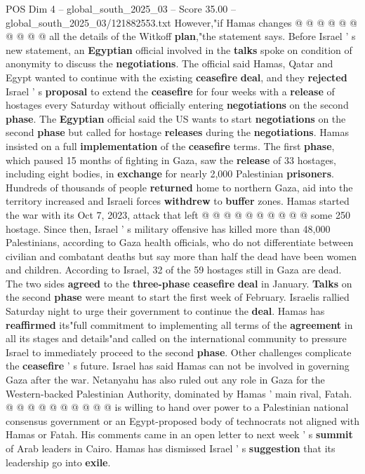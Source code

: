 \begin{textsample}{POS Dim 4 – global\_south\_2025\_03 – Score 35.00 – global\_south\_2025\_03/121882553.txt}
However,"if Hamas changes @ @ @ @ @ @ @ @ @ @ all the details of the Witkoff \textbf{plan},"the statement says.
Before Israel ' s new statement, an \textbf{Egyptian} official involved in the \textbf{talks} spoke on condition of anonymity to discuss the \textbf{negotiations}.
The official said Hamas, Qatar and Egypt wanted to continue with the existing \textbf{ceasefire} \textbf{deal}, and they \textbf{rejected} Israel ' s \textbf{proposal} to extend the \textbf{ceasefire} for four weeks with a \textbf{release} of hostages every Saturday without officially entering \textbf{negotiations} on the second \textbf{phase}.
The \textbf{Egyptian} official said the US wants to start \textbf{negotiations} on the second \textbf{phase} but called for hostage \textbf{releases} during the \textbf{negotiations}.
Hamas insisted on a full \textbf{implementation} of the \textbf{ceasefire} terms.
The first \textbf{phase}, which paused 15 months of fighting in Gaza, saw the \textbf{release} of 33 hostages, including eight bodies, in \textbf{exchange} for nearly 2,000 Palestinian \textbf{prisoners}.
Hundreds of thousands of people \textbf{returned} home to northern Gaza, aid into the territory increased and Israeli forces \textbf{withdrew} to \textbf{buffer} zones.
Hamas started the war with its Oct 7, 2023, attack that left @ @ @ @ @ @ @ @ @ @ some 250 hostage.
Since then, Israel ' s military offensive has killed more than 48,000 Palestinians, according to Gaza health officials, who do not differentiate between civilian and combatant deaths but say more than half the dead have been women and children.
According to Israel, 32 of the 59 hostages still in Gaza are dead.
The two sides \textbf{agreed} to the \textbf{three-phase} \textbf{ceasefire} \textbf{deal} in January. \textbf{Talks} on the second \textbf{phase} were meant to start the first week of February.
Israelis rallied Saturday night to urge their government to continue the \textbf{deal}.
Hamas has \textbf{reaffirmed} its"full commitment to implementing all terms of the \textbf{agreement} in all its stages and details"and called on the international community to pressure Israel to immediately proceed to the second \textbf{phase}.
Other challenges complicate the \textbf{ceasefire} ' s future.
Israel has said Hamas can not be involved in governing Gaza after the war.
Netanyahu has also ruled out any role in Gaza for the Western-backed Palestinian Authority, dominated by Hamas ' main rival, Fatah. @ @ @ @ @ @ @ @ @ @ is willing to hand over power to a Palestinian national consensus government or an Egypt-proposed body of technocrats not aligned with Hamas or Fatah.
His comments came in an open letter to next week ' s \textbf{summit} of Arab leaders in Cairo.
Hamas has dismissed Israel ' s \textbf{suggestion} that its leadership go into \textbf{exile}.

\end{textsample}
